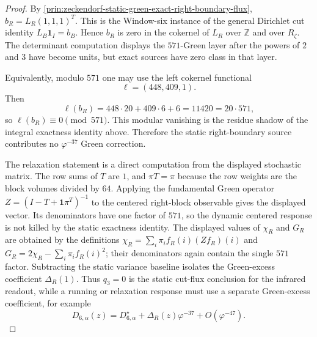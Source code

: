 \begin{proof}
By
\autoref{prin:zeckendorf-static-green-exact-right-boundary-flux},
$b_R=L_R(1,1,1)^T$. This is the Window-six instance of the general
Dirichlet cut identity $L_B\mathbf{1}_I=b_B$. Hence $b_R$ is zero in the
cokernel of $L_R$ over $\mathbb{Z}$ and over $R_\zeta$. The determinant
computation displays the $571$-Green layer after the powers of $2$ and
$3$ have become units, but exact sources have zero class in that layer.

Equivalently, modulo $571$ one may use the left cokernel functional
$$
  \ell=(448,409,1).
$$
Then
$$
  \ell(b_R)
  =
  448\cdot20+409\cdot6+6
  =
  11420
  =
  20\cdot571,
$$
so $\ell(b_R)\equiv0\pmod{571}$. This modular vanishing is the residue
shadow of the integral exactness identity above. Therefore the static
right-boundary source contributes no $\varphi^{-37}$ Green correction.

The relaxation statement is a direct computation from the displayed
stochastic matrix. The row sums of $T$ are $1$, and $\pi T=\pi$ because
the row weights are the block volumes divided by $64$. Applying the
fundamental Green operator $Z=(I-T+\mathbf{1}\pi^T)^{-1}$ to the centered
right-block observable gives the displayed vector. Its denominators have
one factor of $571$, so the dynamic centered response is not killed by
the static exactness identity. The displayed values of $\chi_R$ and
$G_R$ are obtained by the definitions
$\chi_R=\sum_i\pi_i f_R(i)(Zf_R)(i)$ and
$G_R=2\chi_R-\sum_i\pi_i f_R(i)^2$; their denominators again contain the
single $571$ factor. Subtracting the static variance baseline isolates
the Green-excess coefficient $\Delta_R(1)$. Thus $q_3=0$ is the static
cut-flux conclusion for the infrared readout, while a running or
relaxation response must use a separate Green-excess coefficient, for
example
$$
  D_{6,\alpha}(z)
  =
  D_{6,\alpha}^{\star}
  +
  \Delta_R(z)\varphi^{-37}
  +
  O(\varphi^{-47}).
$$
\end{proof}


